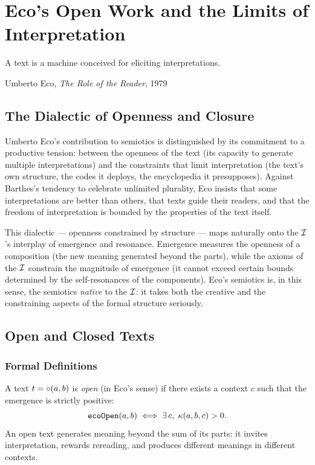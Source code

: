 \chapter{Eco's Open Work and the Limits of Interpretation}
\label{ch:eco}

\epigraph{A text is a machine conceived for eliciting interpretations.}{Umberto Eco, \textit{The Role of the Reader}, 1979}

\section{The Dialectic of Openness and Closure}

Umberto Eco's contribution to semiotics is distinguished by its
commitment to a productive tension: between the openness of the text
(its capacity to generate multiple interpretations) and the constraints
that limit interpretation (the text's own structure, the codes it
deploys, the encyclopedia it presupposes). Against Barthes's tendency
to celebrate unlimited plurality, Eco insists that some interpretations
are better than others, that texts guide their readers, and that the
freedom of interpretation is bounded by the properties of the text
itself.

This dialectic --- openness constrained by structure --- maps naturally
onto the $\mathcal{I}$'s interplay of emergence and resonance. Emergence
measures the openness of a composition (the new meaning generated
beyond the parts), while the axioms of the $\mathcal{I}$ constrain the
magnitude of emergence (it cannot exceed certain bounds determined by
the self-resonances of the components). Eco's semiotics is, in this
sense, the semiotics \emph{native} to the $\mathcal{I}$: it takes both the
creative and the constraining aspects of the formal structure seriously.

\section{Open and Closed Texts}

\subsection{Formal Definitions}

\begin{definition}
\label{def:eco-open}
A text $t = \circ(a, b)$ is \emph{open} (in Eco's sense) if there
exists a context $c$ such that the emergence is strictly positive:
\[
  \texttt{ecoOpen}(a, b) \iff \exists\, c,\; \kappa(a, b, c) > 0.
\]
An open text generates meaning beyond the sum of its parts: it invites
interpretation, rewards rereading, and produces different meanings in
different contexts.
\end{definition}

